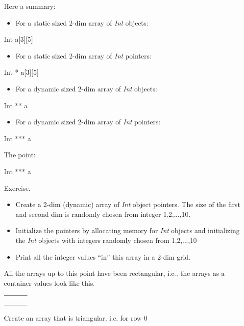 \documentclass[
]{article}
\providecommand{\tightlist}{%
  \setlength{\itemsep}{0pt}\setlength{\parskip}{0pt}}
\begin{document}
Here a summary:

\begin{itemize}
\tightlist
\item
  For a static sized 2-dim array of \emph{Int} objects:
\end{itemize}

Int a{[}3{]}{[}5{]}

\begin{itemize}
\tightlist
\item
  For a static sized 2-dim array of \emph{Int} pointers:
\end{itemize}

Int * a{[}3{]}{[}5{]}

\begin{itemize}
\tightlist
\item
  For a dynamic sized 2-dim array of \emph{Int} objects:
\end{itemize}

Int ** a

\begin{itemize}
\tightlist
\item
  For a dynamic sized 2-dim array of \emph{Int} pointers:
\end{itemize}

Int *** a

The point:

Int *** a

Exercise.

\begin{itemize}
\tightlist
\item
  Create a 2-dim (dynamic) array of \emph{Int} object pointers. The size
  of the first and second dim is randomly chosen from integer
  1,2,...,10.
\item
  Initialize the pointers by allocating memory for \emph{Int} objects
  and initializing the \emph{Int} objects with integers randomly chosen
  from 1,2,...,10
\item
  Print all the integer values ``in'' this array in a 2-dim grid.
\end{itemize}

All the arrays up to this point have been rectangular, i.e., the arrays
as a container values look like this.

\begin{longtable}[]{@{}lll@{}}
\toprule
\endhead
& &\tabularnewline
& &\tabularnewline
& &\tabularnewline
\bottomrule
\end{longtable}

Create an array that is triangular, i.e. for row 0
\end{document}
